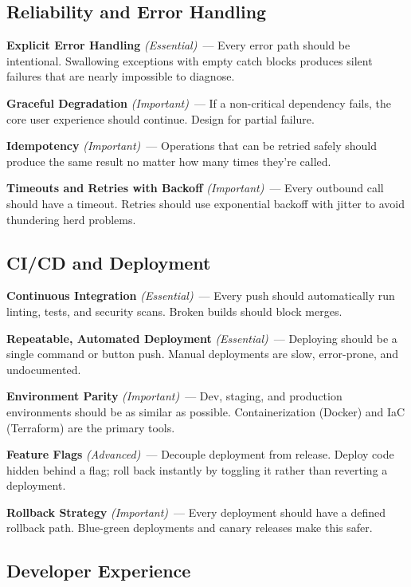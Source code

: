 \subsection*{Reliability and Error Handling}\label{writing-good-code:reliability-and-error-handling}

\textbf{Explicit Error Handling} \emph{(Essential)}~--- Every error path should be intentional. Swallowing exceptions with empty catch blocks produces silent failures that are nearly impossible to diagnose.

\textbf{Graceful Degradation} \emph{(Important)}~--- If a non-critical dependency fails, the core user experience should continue. Design for partial failure.

\textbf{Idempotency} \emph{(Important)}~--- Operations that can be retried safely should produce the same result no matter how many times they're called.

\textbf{Timeouts and Retries with Backoff} \emph{(Important)}~--- Every outbound call should have a timeout. Retries should use exponential backoff with jitter to avoid thundering herd problems.

\subsection*{CI/CD and Deployment}\label{writing-good-code:cicd-and-deployment}

\textbf{Continuous Integration} \emph{(Essential)}~--- Every push should automatically run linting, tests, and security scans. Broken builds should block merges.

\textbf{Repeatable, Automated Deployment} \emph{(Essential)}~--- Deploying should be a single command or button push. Manual deployments are slow, error-prone, and undocumented.

\textbf{Environment Parity} \emph{(Important)}~--- Dev, staging, and production environments should be as similar as possible. Containerization (Docker) and IaC (Terraform) are the primary tools.

\textbf{Feature Flags} \emph{(Advanced)}~--- Decouple deployment from release. Deploy code hidden behind a flag; roll back instantly by toggling it rather than reverting a deployment.

\textbf{Rollback Strategy} \emph{(Important)}~--- Every deployment should have a defined rollback path. Blue-green deployments and canary releases make this safer.

\subsection*{Developer Experience}\label{writing-good-code:developer-experience}

